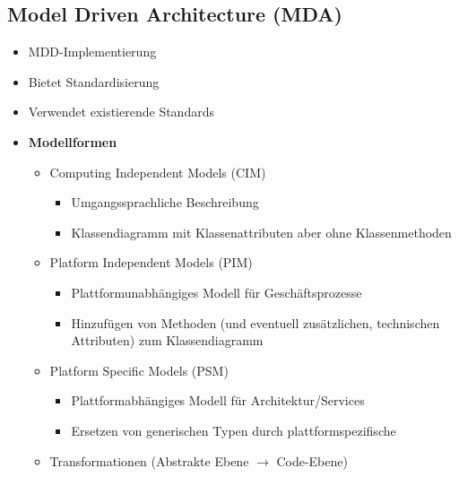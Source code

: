 \subsection{Model Driven Architecture (MDA)}
\begin{itemize}
	\item MDD-Implementierung
	\item Bietet Standardisierung
	\item Verwendet existierende Standards
	\item \textbf{Modellformen}
	\begin{itemize}
		\item Computing Independent Models (CIM)
		\begin{itemize}
			\item Umgangssprachliche Beschreibung
			\item Klassendiagramm mit Klassenattributen aber ohne Klassenmethoden
		\end{itemize}
		\item Platform Independent Models (PIM)
		\begin{itemize}
			\item Plattformunabhängiges Modell für Geschäftsprozesse
			\item Hinzufügen von Methoden (und eventuell zusätzlichen, technischen Attributen) zum Klassendiagramm
		\end{itemize}
		\item Platform Specific Models (PSM)
		\begin{itemize}
			\item Plattformabhängiges Modell für Architektur/Services
			\item Ersetzen von generischen Typen durch plattformspezifische
		\end{itemize}
		\item Transformationen (Abstrakte Ebene \(\rightarrow\) Code-Ebene)\\\\
	\end{itemize}
\end{itemize}


